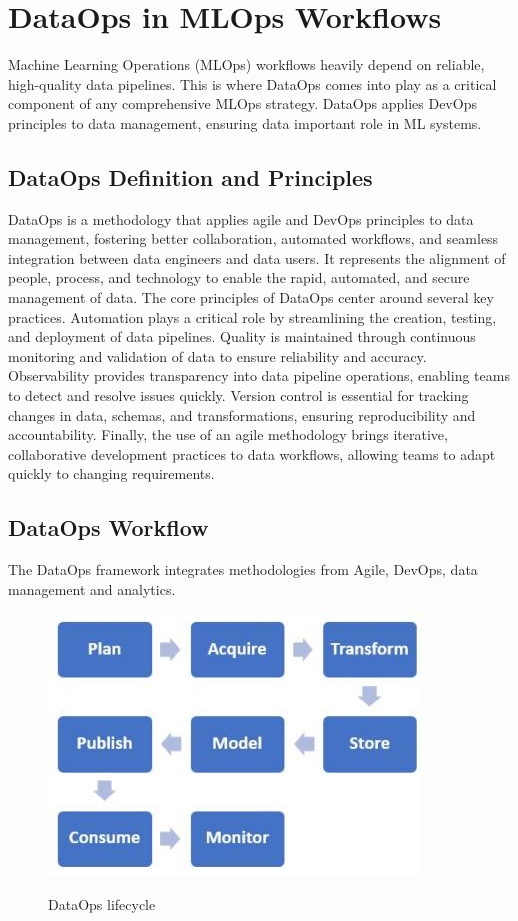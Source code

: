\section{DataOps in MLOps Workflows}\label{sec:dataops}
Machine Learning Operations (MLOps) workflows heavily depend on reliable, high-quality data pipelines\cite{dataops-mlops}.
This is where DataOps comes into play as a critical component of any comprehensive MLOps strategy.
DataOps applies DevOps principles to data management, ensuring data important role in ML systems.

\subsection{DataOps Definition and Principles}\label{subsec:dataops-definition}
DataOps is a methodology that applies agile and DevOps principles to data management, fostering better collaboration,
automated workflows, and seamless integration between data engineers and data users\cite{ad-hoc-dataops}.
It represents the alignment of people, process, and technology to enable the rapid, automated, and secure management of data.
The core principles of DataOps center around several key practices.
Automation plays a critical role by streamlining the creation, testing, and deployment of data pipelines.
Quality is maintained through continuous monitoring and validation of data to ensure reliability and accuracy.
Observability provides transparency into data pipeline operations, enabling teams to detect and resolve issues quickly.
Version control is essential for tracking changes in data, schemas, and transformations, ensuring reproducibility and accountability.
Finally, the use of an agile methodology brings iterative, collaborative development practices to data workflows, allowing teams to adapt quickly to changing requirements.

\subsection{DataOps Workflow}\label{subsec:dataops-workflow}
The DataOps framework integrates methodologies from Agile, DevOps, data management and analytics.

\begin{figure}[!htbp]
    \caption{DataOps lifecycle\cite{FANNOUCH2025100321}}
    \centering
    \includegraphics[scale=0.5]{images/dataops-workflow}
    \label{fig:dataops-workflow}
\end{figure}

